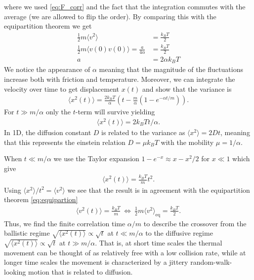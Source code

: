 where we used \cref{eq:F_corr} and the fact that the integration commutes with
the average (we are allowed to flip the order). By comparing this with the
equipartition theorem we get 
\begin{align*}
  \frac{1}{2}m\langle  v^2 \rangle &= \frac{k_BT}{2} \\
  \frac{1}{2}m\langle  v(0) v(0) \rangle = \frac{a}{4\alpha} &= \frac{k_BT}{2} \\
  a &=  2\alpha k_B T 
\end{align*}
We notice the appearance of $\alpha$ meaning that the magnitude of the
fluctuations increase both with friction and temperature. Moreover, we can
integrate the velocity over time to get displacement $x(t)$ and show that the
variance is 
\begin{align*}
  \big\langle x^2(t) \big\rangle = \frac{2 k_B T}{\alpha} \left(t - \frac{m}{\alpha}\left(1 - e^{-\alpha t/m} \right) \right).
\end{align*}
For $t \gg m/\alpha$ only the $t$-term will survive yielding
\begin{align*}
  \langle x^2(t) \rangle = 2 k_BTt/\alpha.
\end{align*}
In 1D, the diffusion constant $D$ is related to the variance as $\langle x^2
\rangle = 2Dt$, meaning that this represents the einstein relation $D = \mu k_B
T$ with the mobility $\mu = 1/\alpha$.

When $t \ll m/\alpha$ we use the Taylor expansion $1 - e^{-x} \approx x - x^2/2$
for $x\ll 1$ which give
\begin{align*}
  \big\langle x^2(t) \big\rangle = \frac{k_B T}{m} t^2.
\end{align*}
Using $\langle x^2 \rangle / t^2 = \langle v^2 \rangle$ we see that the result is in agreement with the equipartition theorem \cref{eq:equipartion}
\begin{align*}
  \big\langle v^2(t) \big\rangle = \frac{k_B T}{m} \ \Longleftrightarrow \ \frac{1}{2}m\langle v^2 \rangle_{\text{eq}} = \frac{k_B T}{2}.
\end{align*}
Thus, we find the finite correlation time $\alpha/m$ to describe the crossover from the ballistic regime $\sqrt{\langle x^2(t)
\rangle} \propto \sqrt{t}$ at $t \ll m/\alpha$ to the diffusive regime $\sqrt{\langle x^2(t)\rangle} \propto \sqrt{t}$ at $t \gg m/\alpha$. That is, at short time scales the thermal movement can be thought of as relatively free with a low collision rate, while at longer time scales the movement is characterized by a jittery random-walk-looking motion that is related to diffusion. 


